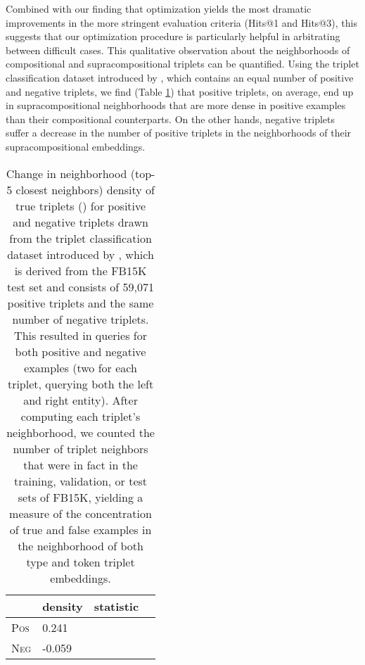 \documentclass[a4paper,10pt]{article}
\begin{document}
Combined with our finding that optimization yields the most dramatic improvements in the more stringent evaluation criteria (Hits@1 and Hits@3), this suggests that our optimization procedure is particularly helpful in arbitrating between difficult cases. This qualitative observation about the neighborhoods of compositional and supracompositional triplets can be quantified. Using the triplet classification dataset introduced by \citet{socher2013neuraltensor}, which contains an equal number of positive and negative triplets, we find (Table \ref{table_neighborhood_results}) that positive triplets, on average, end up in supracompositional neighborhoods that are more dense in positive examples than their compositional counterparts. On the other hands, negative triplets suffer a decrease in the number of positive triplets in the neighborhoods of their supracompositional embeddings. 
\begin{table}
\begin{center}
\begin{tabular}{|l|l|l|l|} \hline
	&	density &  statistic &  \\\hline
\textsc{Pos} 	& 0.241	&  & \\
\textsc{Neg}	& -0.059 &  &  \\\hline
\end{tabular} \end{center}
\caption{Change in neighborhood (top-5 closest neighbors) density of true triplets () for positive and negative triplets drawn from the triplet classification dataset introduced by \citet{socher2013neuraltensor}, which is derived from the FB15K test set and consists of 59,071 positive triplets and the same number of negative triplets. This resulted in  queries for both positive and negative examples (two for each triplet, querying both the left and right entity). After computing each triplet's neighborhood, we counted the number of triplet neighbors that were in fact in the training, validation, or test sets of FB15K, yielding a measure of the concentration of true and false examples in the neighborhood of both type and token triplet embeddings. } \label{table_neighborhood_results}
\end{table} 
\end{document}

